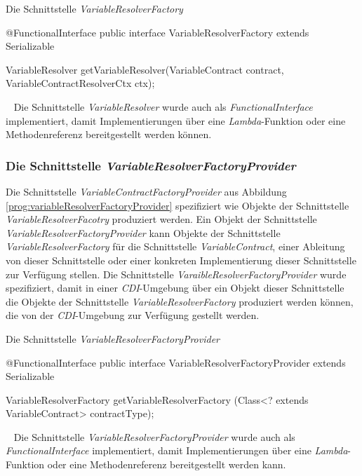 \begin{program}[h]
\caption{Die Schnittstelle \emph{VariableResolverFactory}}
\label{prog:variableResolverFactory}
\begin{JavaCode}
@FunctionalInterface
public interface VariableResolverFactory extends Serializable {

  VariableResolver getVariableResolver(VariableContract contract,
                                       VariableContractResolverCtx ctx);
}
\end{JavaCode}
\end{program}
\ \newline
Die Schnittstelle \emph{VariableResolver} wurde auch als \emph{FunctionalInterface} implementiert, damit Implementierungen über eine \emph{Lambda}-Funktion oder eine Methodenreferenz bereitgestellt werden können.

\subsubsection{Die Schnittstelle \emph{VariableResolverFactoryProvider}}
\label{sec:VariableResolverFactoryProvider}
Die Schnittstelle \emph{VariableContractFactoryProvider} aus Abbildung \ref{prog:variableResolverFactoryProvider} spezifiziert wie Objekte der Schnittstelle \emph{VariableResolverFacotry} produziert werden. Ein Objekt der Schnittstelle \emph{VariableResolverFactoryProvider} kann Objekte der Schnittstelle \emph{VariableResolverFactory} für die Schnittstelle \emph{VariableContract}, einer Ableitung von dieser Schnittstelle oder einer konkreten Implementierung dieser Schnittstelle zur Verfügung stellen. Die Schnittstelle \emph{VaraibleResolverFactoryProvider} wurde spezifiziert, damit in einer \emph{CDI}-Umgebung über ein Objekt dieser Schnittstelle die Objekte der Schnittstelle \emph{VariableResolverFactory} produziert werden können, die von der \emph{CDI}-Umgebung zur Verfügung gestellt werden.

\begin{program}[h]
\caption{Die Schnittstelle \emph{VariableResolverFactoryProvider}}
\label{prog:variableResolverFactoryProvider}
\begin{JavaCode}
@FunctionalInterface
public interface VariableResolverFactoryProvider extends Serializable {

    VariableResolverFactory getVariableResolverFactory
            (Class<? extends VariableContract> contractType);
}
\end{JavaCode}
\end{program}
\ \newline
Die Schnittstelle \emph{VariableResolverFactoryProvider} wurde auch als \emph{FunctionalInterface} implementiert, damit Implementierungen über eine \emph{Lambda}-Funktion oder eine Methodenreferenz bereitgestellt werden kann.

